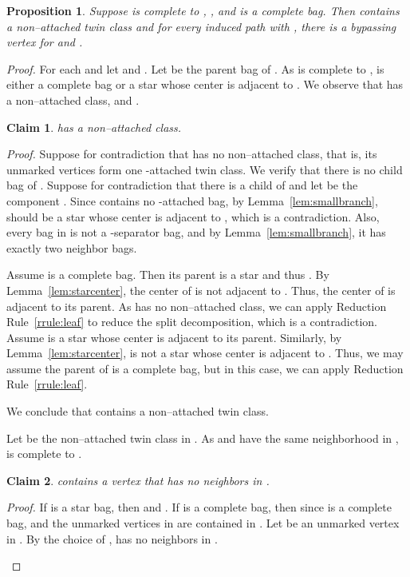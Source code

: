 \documentclass[11pt]{elsarticle}
\newtheorem{PROP}[theorem]{Proposition}
\newtheorem{claim}{Claim}
\newenvironment{clproof}{\begin{list}{}{\setlength{\leftmargin}{5mm}} \item {\it Proof.} }{\hfill\end{list}\medskip}
\begin{document}
\begin{PROP}
\label{prop:complete1}
  Suppose  is complete to , , and  is a complete bag. 
  Then  contains a non--attached twin class  and 
  for every induced path  with , 
  there is a bypassing vertex for  and . 
   \end{PROP}
  \begin{proof}
For each  and let  and .
Let  be the parent bag of .
As  is complete to ,
 is either a complete bag or a star whose center is adjacent to .
We observe that  has a non--attached class, and .

\begin{claim}
 has a non--attached class.
\end{claim}
\begin{clproof}
Suppose for contradiction that  has no non--attached class, that is, its unmarked vertices form one -attached twin class.
We verify that there is no child bag of .
Suppose for contradiction that there is a child  of  and let  be the component .
Since  contains no -attached bag, by Lemma~\ref{lem:smallbranch},  should be a star whose center is adjacent to , which is a contradiction.
Also, every bag in   is not a -separator bag, and by Lemma~\ref{lem:smallbranch},  it has exactly two neighbor bags.

Assume  is a complete bag. Then its parent  is a star 
and thus . 
By Lemma~\ref{lem:starcenter},
 the center of  is not adjacent to .
Thus, the center of  is adjacent to its parent.
As  has no non--attached class, 
we can apply Reduction Rule~\ref{rrule:leaf} to reduce the split decomposition, which is a contradiction.
Assume  is a star whose center is adjacent to its parent.
Similarly, by Lemma~\ref{lem:starcenter}, 
 is not a star whose center is adjacent to .
 Thus, we may assume the parent of  is a complete bag, but in this case, we can apply Reduction Rule~\ref{rrule:leaf}.

We conclude that  contains a non--attached twin class.
\end{clproof}

Let  be the non--attached twin class in . As  and  have the same neighborhood in , 
 is complete to .
  
\begin{claim}
 contains a vertex that has no neighbors in .
\end{claim}
\begin{clproof}
If  is a star bag, then  and .
If  is a complete bag, then since  is a complete bag,  and the unmarked vertices in  are contained in .
Let  be an unmarked vertex in .
By the choice of ,  has no neighbors in .
\end{clproof}


\end{proof}
\end{document}
